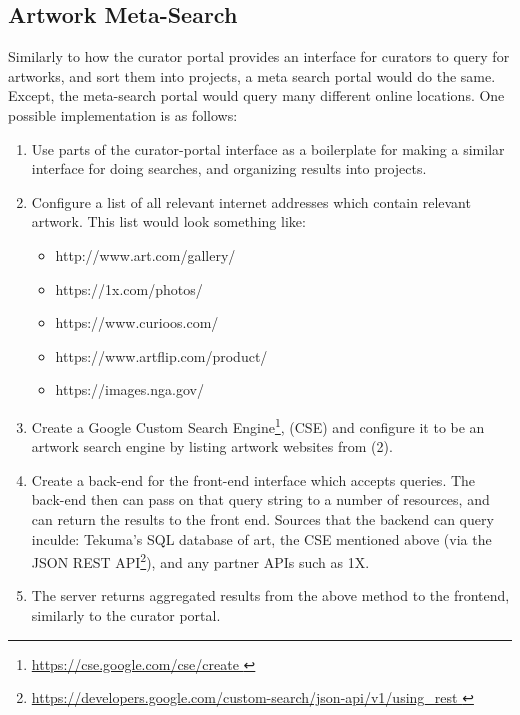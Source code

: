 \documentclass[fontsize=12pt]{scrartcl} %
\begin{document}
\subsection{Artwork Meta-Search}
Similarly to how the curator portal provides an interface for curators to query for artworks, and sort them into projects, a meta search portal would do the same. Except, the meta-search portal would query many different online locations. One possible implementation is as follows:\\
\begin{enumerate}
    \item Use parts of the curator-portal interface as a boilerplate for making a similar interface for doing searches, and organizing results into projects.
    \item Configure a list of all relevant internet addresses which contain relevant artwork. This list would look something like: \begin{itemize}
        \item http://www.art.com/gallery/
        \item https://1x.com/photos/
        \item https://www.curioos.com/
        \item https://www.artflip.com/product/
        \item https://images.nga.gov/
    \end{itemize}
    \item Create a Google Custom Search Engine\footnote{\url{https://cse.google.com/cse/create }}, (CSE) and configure it to be an artwork search engine by listing artwork websites from (2).
    \item Create a back-end for the front-end interface which accepts queries. The back-end then can pass on that query string to a number of resources, and can return the results to the front end. Sources that the backend can query inculde: Tekuma's SQL database of art, the CSE mentioned above (via the JSON REST API\footnote{\url{https://developers.google.com/custom-search/json-api/v1/using_rest }}), and any partner APIs such as 1X.
    \item The server returns aggregated results from the above method to the frontend, similarly to the curator portal.

\end{enumerate}
\end{document}
